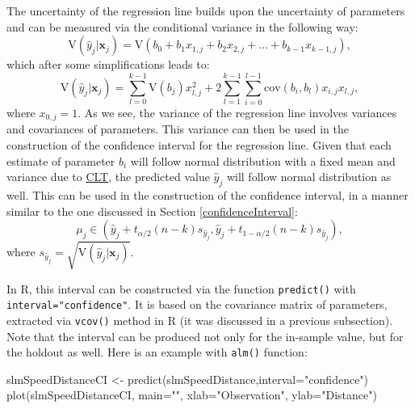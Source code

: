 \documentclass[
]{book}
\newenvironment{Shaded}{\begin{snugshade}}{\end{snugshade}}
\newcommand{\AttributeTok}[1]{\textcolor[rgb]{0.77,0.63,0.00}{#1}}
\newcommand{\FunctionTok}[1]{\textcolor[rgb]{0.00,0.00,0.00}{#1}}
\newcommand{\NormalTok}[1]{#1}
\newcommand{\OtherTok}[1]{\textcolor[rgb]{0.56,0.35,0.01}{#1}}
\newcommand{\StringTok}[1]{\textcolor[rgb]{0.31,0.60,0.02}{#1}}
\theoremstyle{definition}
\theoremstyle{definition}
\theoremstyle{definition}
\theoremstyle{definition}
\theoremstyle{remark}
\begin{document}
The uncertainty of the regression line builds upon the uncertainty of parameters and can be measured via the conditional variance in the following way:
\begin{equation}
    \mathrm{V}(\hat{y}_j| \mathbf{x}_j) = \mathrm{V}(b_0 + b_1 x_{1,j} + b_2 x_{2,j} + \dots + b_{k-1} x_{k-1,j}) ,
    \label{eq:regressionLineUncertaintyVariance01}
\end{equation}
which after some simplifications leads to:
\begin{equation}
    \mathrm{V}(\hat{y}_j| \mathbf{x}_j) = \sum_{l=0}^{k-1} \mathrm{V}(b_j) x^2_{l,j} + 2 \sum_{l=1}^{k-1} \sum_{i=0}^{l-1}  \mathrm{cov}(b_i,b_l) x_{i,j} x_{l,j} ,
    \label{eq:regressionLineUncertaintyVariance02}
\end{equation}
where \(x_{0,j}=1\). As we see, the variance of the regression line involves variances and covariances of parameters. This variance can then be used in the construction of the confidence interval for the regression line. Given that each estimate of parameter \(b_i\) will follow normal distribution with a fixed mean and variance due to \protect\hyperlink{CLT}{CLT}, the predicted value \(\hat{y}_j\) will follow normal distribution as well. This can be used in the construction of the confidence interval, in a manner similar to the one discussed in Section \ref{confidenceInterval}:
\begin{equation}
    \mu_j \in (\hat{y}_j + t_{\alpha/2}(n-k) s_{\hat{y}_j}, \hat{y}_j + t_{1-\alpha/2}(n-k) s_{\hat{y}_j}),
    \label{eq:confidenceIntervalRegression}
\end{equation}
where \(s_{\hat{y}_j}=\sqrt{\mathrm{V}(\hat{y}_j| \mathbf{x}_j)}\).

In R, this interval can be constructed via the function \texttt{predict()} with \texttt{interval="confidence"}. It is based on the covariance matrix of parameters, extracted via \texttt{vcov()} method in R (it was discussed in a previous subsection). Note that the interval can be produced not only for the in-sample value, but for the holdout as well. Here is an example with \texttt{alm()} function:

\begin{Shaded}
\begin{Highlighting}[]
\NormalTok{slmSpeedDistanceCI }\OtherTok{\textless{}{-}} \FunctionTok{predict}\NormalTok{(slmSpeedDistance,}\AttributeTok{interval=}\StringTok{"confidence"}\NormalTok{)}
\FunctionTok{plot}\NormalTok{(slmSpeedDistanceCI, }\AttributeTok{main=}\StringTok{""}\NormalTok{,}
     \AttributeTok{xlab=}\StringTok{"Observation"}\NormalTok{, }\AttributeTok{ylab=}\StringTok{"Distance"}\NormalTok{)}
\end{Highlighting}
\end{Shaded}
\end{document}
